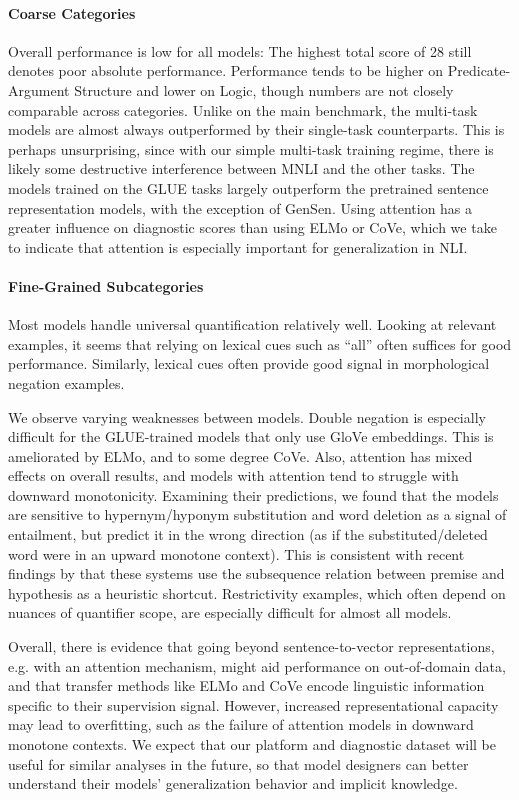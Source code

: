 \documentclass{article} \usepackage{iclr2019_conference,times}
\begin{document}
\paragraph{Coarse Categories}
Overall performance is low for all models: The highest total score of 28 still denotes poor absolute performance.
Performance tends to be higher on Predicate-Argument Structure and lower on Logic, though numbers are not closely comparable across categories.
Unlike on the main benchmark, the multi-task models are almost always outperformed by their single-task counterparts.
This is perhaps unsurprising, since with our simple multi-task training regime, there is likely some destructive interference between MNLI and the other tasks.
The models trained on the GLUE tasks largely outperform the pretrained sentence representation models, with the exception of GenSen.
Using attention has a greater influence on diagnostic scores than using ELMo or CoVe, which we take to indicate that attention is especially important for generalization in NLI.



\paragraph{Fine-Grained Subcategories}

Most models handle universal quantification relatively well.
Looking at relevant examples, it seems that relying on lexical cues such as ``all'' often suffices for good performance.
Similarly, lexical cues often provide good signal in morphological negation examples.

We observe varying weaknesses between models.
Double negation is especially difficult for the GLUE-trained models that only use GloVe embeddings. 
This is ameliorated by ELMo, and to some degree CoVe.
Also, attention has mixed effects on overall results, and models with attention tend to struggle with downward monotonicity.
Examining their predictions, we found that the models are sensitive to hypernym/hyponym substitution and word deletion as a signal of entailment, but predict it in the wrong direction (as if the substituted/deleted word were in an upward monotone context).
This is consistent with recent findings by \citet{mccoy2019subsequence} that these systems use the subsequence relation between premise and hypothesis as a heuristic shortcut.
Restrictivity examples, which often depend on nuances of quantifier scope, are especially difficult for almost all models.

Overall, there is evidence that going beyond sentence-to-vector representations, e.g. with an attention mechanism, might aid performance on out-of-domain data, and that transfer methods like ELMo and CoVe encode linguistic information specific to their supervision signal.
However, increased representational capacity may lead to overfitting, such as the failure of attention models in downward monotone contexts.
We expect that our platform and diagnostic dataset will be useful for similar analyses in the future, so that model designers can better understand their models' generalization behavior and implicit knowledge. 
\end{document}
